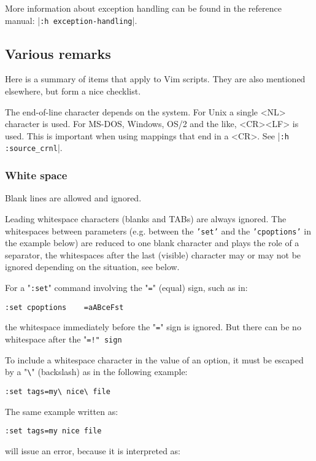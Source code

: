 More information about exception handling can be found in the reference manual: |\texttt{:h exception-handling}|.
\subsection{Various remarks}
Here is a summary of items that apply to Vim scripts.
They are also mentioned elsewhere, but form a nice checklist.

The end-of-line character depends on the system.
For Unix a single <NL> character is used.
For MS-DOS, Windows, OS/2 and the like, <CR><LF> is used.
This is important when using mappings that end in a <CR>.
See |\texttt{:h :source\_crnl}|.
\subsubsection{White space}
Blank lines are allowed and ignored.

Leading whitespace characters (blanks and TABs) are always ignored.
The whitespaces between parameters (e.g. between the \texttt{'set'} and the \texttt{'cpoptions'} in the example below) are reduced to one blank character and plays the role of a separator, the whitespaces after the last (visible) character may or may not be ignored depending on the situation, see below.

For a "\texttt{:set}" command involving the "\texttt{=}" (equal) sign, such as in:

\begin{Verbatim}[samepage=true]
 :set cpoptions    =aABceFst
\end{Verbatim}

the whitespace immediately before the "\texttt{=}" sign is ignored.
But there can be no whitespace after the "\texttt{=!" sign}

To include a whitespace character in the value of an option, it must be escaped by a "\texttt{\textbackslash{}}" (backslash)  as in the following example:

\begin{Verbatim}[samepage=true]
 :set tags=my\ nice\ file
\end{Verbatim}

The same example written as:

\begin{Verbatim}[samepage=true]
 :set tags=my nice file
\end{Verbatim}

will issue an error, because it is interpreted as:


